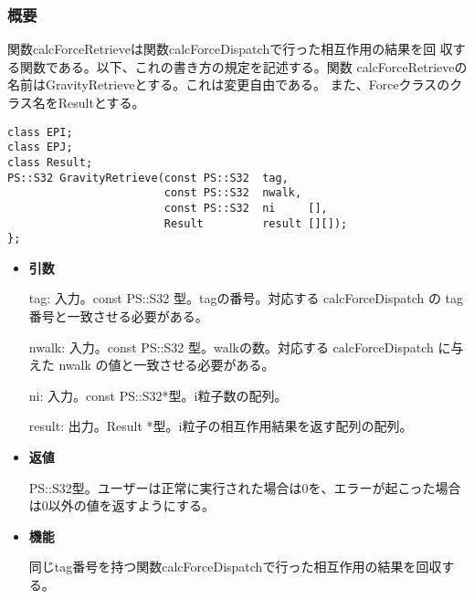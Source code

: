 
\subsubsection{概要}

関数calcForceRetrieveは関数calcForceDispatchで行った相互作用の結果を回
収する関数である。以下、これの書き方の規定を記述する。関数
calcForceRetrieveの名前はGravityRetrieveとする。これは変更自由である。
また、Forceクラスのクラス名をResultとする。

\begin{lstlisting}[caption=calcForceDispatch]
class EPI;
class EPJ;
class Result;
PS::S32 GravityRetrieve(const PS::S32  tag,
                        const PS::S32  nwalk,
                        const PS::S32  ni     [],
                        Result         result [][]);
};
\end{lstlisting}

\begin{itemize}

\item {\bf 引数}


  tag: 入力。const PS::S32 型。tagの番号。対応する calcForceDispatch の
  tag 番号と一致させる必要がある。

  nwalk: 入力。const PS::S32 型。walkの数。対応する calcForceDispatch
  に与えた nwalk の値と一致させる必要がある。

  ni: 入力。const PS::S32*型。i粒子数の配列。
  
  result: 出力。Result *型。i粒子の相互作用結果を返す配列の配列。

\item {\bf 返値}

  PS::S32型。ユーザーは正常に実行された場合は0を、エラーが起こった場合
  は0以外の値を返すようにする。
  

\item {\bf 機能}

同じtag番号を持つ関数calcForceDispatchで行った相互作用の結果を回収する。

\end{itemize}

